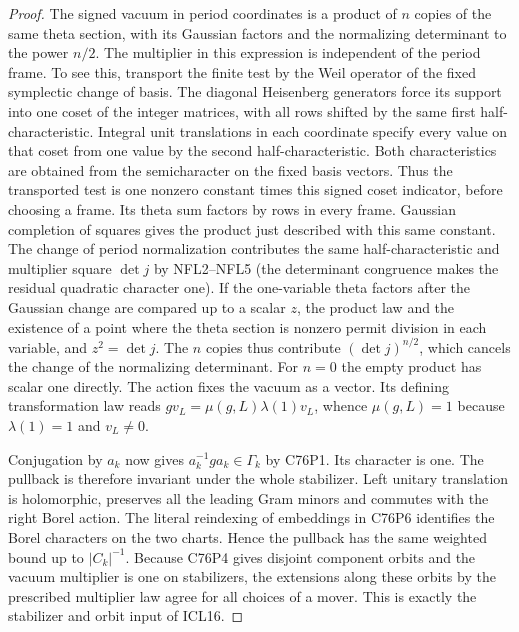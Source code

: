 \begin{proof}
The signed vacuum in period coordinates is a product of $n$ copies
of the same theta section, with its Gaussian factors and the
normalizing determinant to the power $n/2$. The multiplier in this expression is independent of the period
frame. To see this, transport the finite test by the Weil
operator of the fixed symplectic change of basis. The diagonal
Heisenberg generators force its support into one coset of the
integer matrices, with all rows shifted by the same first
half-characteristic. Integral unit translations in each coordinate
specify every value on that coset from one value by the second
half-characteristic. Both characteristics are obtained from the
semicharacter on the fixed basis vectors. Thus the transported
test is one nonzero constant times this signed coset indicator,
before choosing a frame. Its theta sum factors by rows in every
frame. Gaussian completion of squares gives the product just
described with this same constant. The change of period normalization
contributes the same half-characteristic and multiplier square
$\det j$ by NFL2--NFL5 (the determinant congruence makes the
residual quadratic character one). If the one-variable theta
factors after the Gaussian change are compared up to a scalar
$z$, the product law and the existence of a point where the theta
section is nonzero permit division in each variable, and
$z^2=\det j$. The $n$ copies thus contribute
$(\det j)^{n/2}$, which cancels the change of the normalizing
determinant. For $n=0$ the empty product has scalar one directly.
The action fixes the vacuum as a vector. Its defining transformation
law reads $g v_L=\mu(g,L)\lambda(1)v_L$, whence $\mu(g,L)=1$
because $\lambda(1)=1$ and $v_L\ne0$.

Conjugation by $a_k$ now gives
$a_k^{-1}g a_k\in\Gamma_k$ by C76P1. Its character is one.
The pullback is therefore invariant under the whole stabilizer.
Left unitary translation is holomorphic, preserves all the leading
Gram minors and commutes with the right Borel action. The literal
reindexing of embeddings in C76P6 identifies the Borel characters
on the two charts. Hence the pullback has the same weighted bound
up to $|C_k|^{-1}$. Because C76P4 gives disjoint component orbits
and the vacuum multiplier is one on stabilizers, the extensions
along these orbits by the prescribed multiplier law agree for
all choices of a mover. This is exactly the stabilizer and orbit
input of ICL16.
\end{proof}
